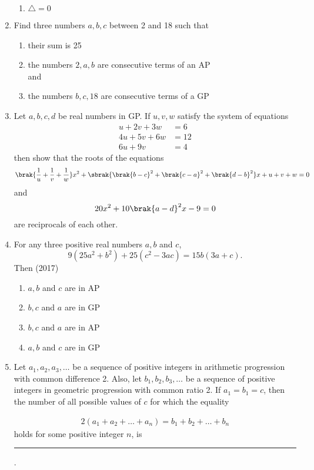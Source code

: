 \begin{enumerate}[label=\thesubsection.\arabic*,ref=\thesubsection.\theenumi]
\begin{multicols}{4}
\begin{enumerate}
                    \item $\triangle=0$
                \end{enumerate}
                \end{multicols}
    \item Find three numbers $a, b, c$ between 2 and 18 such that
\begin{enumerate}    
    \item their sum is 25
    \item the numbers $2, a, b$ are consecutive terms of an AP
    \\
    and
    \item the numbers $b, c, 18$ are consecutive terms of a GP\hfill{}
    \end{enumerate}
%  
      \item  Let $ a, b, c, d $ be real numbers in GP. If $u, v, w$ satisfy the system of equations  
%    
	      \hfill {}
%      
\begin{align*}
	u+2v+3w&=6  
	  \\
	  4u+5v+6w&=12 
	  \\
	  6u+9v&=4 
\end{align*}
      then show that the roots of the equations 
		$$\brak{\frac{1}{u}+\frac{1}{v}+\frac{1}{w}}x^{2}+\sbrak{\brak{b-c}^{2}+\brak{c-a}^{2}+\brak{d-b}^{2}}x+u+v+w=0 $$ and $$ 20x^{2}+10\brak{a-d}^{2}x-9=0 $$ are reciprocals of each other.
 \item For any three positive real numbers $a, b$ and $c$,  $$9(25a^2+b^2)+ 25(c^2-3ac) = 15b(3a+c).$$ Then \hfill (2017)
	 \begin{multicols}{2}
\begin{enumerate}    
  \item$a, b$ and $c$ are in AP
  \item{$b, c$ and $a$ are in GP}
  \columnbreak
  \item $b, c$ and $a$ are in AP
  \item{$a, b$ and $c$ are in GP}
  \end{enumerate}
  \end{multicols}
\item       Let $a_1, a_2, a_3, \dots $ be a sequence of positive integers in arithmetic progression with common difference 2. Also, let $b_1, b_2, b_3, \dots $ be a sequence of positive integers in geometric progression with common ratio 2. If $a_1 = b_1 = c$, then the number of all possible values of $c$ for which the equality 

\begin{align*}
     2(a_1 + a_2 + \dots + a_n) = b_1 + b_2 + \dots + b_n
\end{align*}
    holds for some positive integer $n$, is \rule{1cm}{0.1pt}.

\hfill {}
\end{enumerate}

